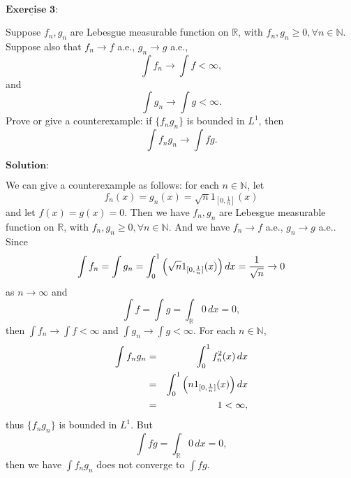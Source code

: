 \documentclass[12pt,a4paper]{ctexart}
\begin{document}
\newpage 

$\underline{\textbf{Exercise 3:}}$

Suppose $f_n, g_n$ are Lebesgue measurable function on $\mathbb R$, with $f_n, g_n \geq 0, \forall n \in \mathbb N$. Suppose also that $f_n \to f$ a.e., $g_n \to g$ a.e.,
$$\int f_n \to \int f < \infty,$$
and
$$\int g_n \to \int g < \infty.$$
Prove or give a counterexample: if $\{f_n g_n\}$ is bounded in $L^1$, then
$$\int f_n g_n \to \int f g.$$

\vspace{8pt}
$\textbf{Solution:}$

We can give a counterexample as follows: for each $n \in \mathbb N$, let
$$f_n (x) = g_n (x) = \sqrt{n} 1_{[0, \frac{1}{n}]}(x)$$
and let $f(x) = g(x) = 0$. Then we have $f_n, g_n$ are Lebesgue measurable function on $\mathbb R$, with $f_n, g_n \geq 0, \forall n \in \mathbb N$. And we have $f_n \to f$ a.e., $g_n \to g$ a.e.. Since
$$\int f_n = \int g_n = \int_{0}^{1} \Big{(} \sqrt{n} 1_{[0, \frac{1}{n}]}(x) \Big{)} \, d x = \frac{1}{\sqrt{n}}  \to 0$$
as $n \to \infty$ and 
$$\int f = \int g = \int_{\mathbb R} 0 \, d x = 0,$$
then $\int f_n \to \int f < \infty$ and $\int g_n \to \int g < \infty$. For each $n \in \mathbb N$,
\begin{eqnarray*}
    \int f_n g_n  & = & \int_{0}^{1} f_n^2(x) \, d x \\
    & = & \int_{0}^{1} \Big{(} n 1_{[0,\frac{1}{n}]}(x) \Big{)} \, d x \\
    & = & 1 < \infty,
\end{eqnarray*}
thus $\{f_n g_n\}$ is bounded in $L^1$. But
$$\int f g = \int_{\mathbb R} 0 \, d x = 0,$$
then we have $\int f_n g_n$ does not converge to $\int f g$.
\end{document}
